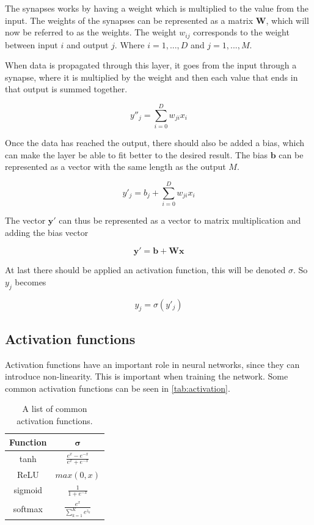 The synapses works by having a weight which is multiplied to the value from the input.
The weights of the synapses can be represented as a matrix $\bm{W}$, which will now be referred to as the weights.
The weight $w_{ij}$ corresponds to the weight between input $i$ and output $j$.
Where $i = 1, ..., D$ and $j = 1, ..., M$.

When data is propagated through this layer, it goes from the input through a synapse, where it is multiplied by the weight and then each value that ends in that output is summed together.

$$y''_j = \sum_{i=0}^D w_{ji}x_i  $$

Once the data has reached the output, there should also be added a bias, which can make the layer be able to fit better to the desired result.
The bias $\bm{b}$ can be represented as a vector with the same length as the output $M$.

$$y'_j = b_j + \sum_{i=0}^D w_{ji}x_i$$

The vector $\bm{y'}$ can thus be represented as a vector to matrix multiplication and adding the bias vector

$$\bm{y'} = \bm{b} + \bm{W}\bm{x}$$

At last there should be applied an activation function, this will be denoted $\sigma$.
So $y_j$ becomes

$$y_j = \sigma \left(y'_j\right)$$

\subsection{Activation functions}%
\label{sub:Activation functions}

Activation functions have an important role in neural networks, since they can introduce non-linearity. This is important when training the network.
Some common activation functions can be seen in \autoref{tab:activation}.

\begin{table}[H]
\centering
\begin{tabular}{|c|c|}\hline
\textbf{Function} & $\bm{\sigma}$ \\\hline
tanh     & $\frac{e^x - e^{-x}}{e^x + e^{-x}}$ \\\hline
ReLU     & $max(0, x)$ \\\hline
sigmoid  & $\frac{1}{1+e^{-x}}$ \\\hline
softmax  & $\frac{e^x}{\sum^K_{k=1} e^{z_k}}$ \\\hline
\end{tabular}
\caption{A list of common activation functions.}
\label{tab:activation}
\end{table}

